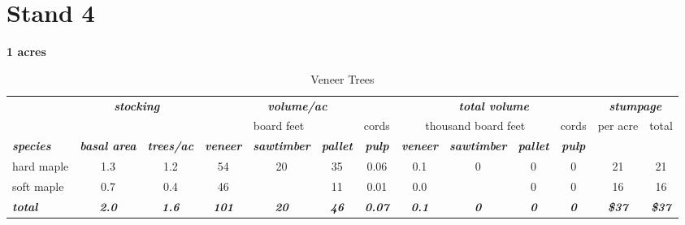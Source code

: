 \documentclass[landscape]{article}
\begin{document}
\pagebreak

\section{Stand 4}\label{stand-4}

\textbf{1 acres}

\begin{table}[H]

\caption{\label{tab:unnamed-chunk-32}Veneer Trees}
\fontsize{10}{12}\selectfont
\begin{tabular}[t]{lcccccccccccc}
\toprule
\multicolumn{1}{c}{\em{\textbf{ }}} & \multicolumn{2}{c}{\em{\textbf{stocking}}} & \multicolumn{4}{c}{\em{\textbf{volume/ac }}} & \multicolumn{4}{c}{\em{\textbf{total volume}}} & \multicolumn{2}{c}{\em{\textbf{stumpage}}} \\
\cmidrule(l{3pt}r{3pt}){2-3} \cmidrule(l{3pt}r{3pt}){4-7} \cmidrule(l{3pt}r{3pt}){8-11} \cmidrule(l{3pt}r{3pt}){12-13}
\multicolumn{3}{c}{ } & \multicolumn{3}{c}{board feet} & \multicolumn{1}{c}{cords} & \multicolumn{3}{c}{thousand board feet} & \multicolumn{1}{c}{cords} & \multicolumn{1}{c}{per acre} & \multicolumn{1}{c}{total} \\
\cmidrule(l{3pt}r{3pt}){4-6} \cmidrule(l{3pt}r{3pt}){7-7} \cmidrule(l{3pt}r{3pt}){8-10} \cmidrule(l{3pt}r{3pt}){11-11} \cmidrule(l{3pt}r{3pt}){12-12} \cmidrule(l{3pt}r{3pt}){13-13}
\rowcolor[HTML]{DCDCDC}  \em{\textbf{species}} & \em{\textbf{basal area}} & \em{\textbf{trees/ac}} & \em{\textbf{veneer}} & \em{\textbf{sawtimber}} & \em{\textbf{pallet}} & \em{\textbf{pulp}} & \em{\textbf{veneer}} & \em{\textbf{sawtimber}} & \em{\textbf{pallet}} & \em{\textbf{pulp}} & \em{\textbf{ }} & \em{\textbf{ }}\\
\midrule
\rowcolor{gray!6}  hard maple & 1.3 & 1.2 & 54 & 20 & 35 & 0.06 & 0.1 & 0 & 0 & 0 & 21 & 21\\
 
soft maple & 0.7 & 0.4 & 46 &  & 11 & 0.01 & 0.0 &  & 0 & 0 & 16 & 16\\
 
\rowcolor{gray!6}  \rowcolor[HTML]{DCDCDC}  \em{\textbf{total}} & \em{\textbf{2.0}} & \em{\textbf{1.6}} & \em{\textbf{101}} & \em{\textbf{20}} & \em{\textbf{46}} & \em{\textbf{0.07}} & \em{\textbf{0.1}} & \em{\textbf{0}} & \em{\textbf{0}} & \em{\textbf{0}} & \em{\textbf{\$37}} & \em{\textbf{\$37}}\\
\bottomrule
\end{tabular}
\end{table}
\end{document}
